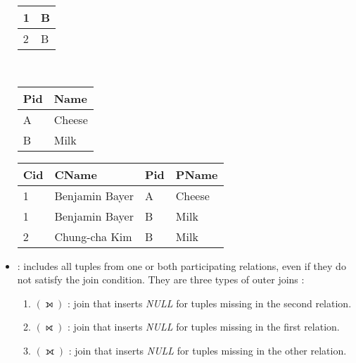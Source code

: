 \begin{itemize}
\begin{minipage}[t]{0.31\textwidth}
\begin{center}
\begin{tabular}{|l|l|}
	    \hline 
	    1 & B \\ 
	    \hline 
	    2 & B \\ 
	    \hline 
	    \end{tabular}
        \end{center}
    \end{minipage}
    \begin{minipage}[t]{0.31\textwidth}
        \begin{center}
        \\
	    \begin{tabular}{|l|l|}
	    \hline 
	    Pid & Name \\ 
	    \hline 
	    \hline 
	    A & Cheese \\ 
	    \hline 
	    B & Milk \\ 
	    \hline 
	    \end{tabular}
        \end{center}
    \end{minipage}
    \begin{center}
    \begin{tabular}{|l|l|l|l|}
    \hline 
    Cid & CName & Pid & PName \\ 
    \hline
    \hline
    1 & Benjamin Bayer & A & Cheese \\ 
    \hline 
    1 & Benjamin Bayer & B & Milk \\ 
    \hline 
    2 & Chung-cha Kim & B & Milk \\ 
    \hline 
    \end{tabular} 
    \end{center}
    \newpage
    \item {} : includes all tuples from one or both participating relations, even if they do not satisfy the join condition. They are three types of outer joins :
    \begin{enumerate}
        \item {} $(\leftouterjoin)$ : join that inserts \textit{NULL} for tuples missing in the second relation.
        \item {} $(\rightouterjoin)$ : join that inserts \textit{NULL} for tuples missing in the first relation.
        \item {} $(\fullouterjoin)$ : join that inserts \textit{NULL} for tuples missing in the other relation.

\end{enumerate}
\end{itemize}
